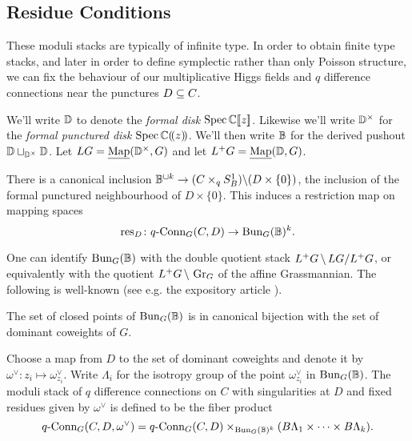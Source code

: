\documentclass[10pt, oneside]{article}
\newcommand{\map}{\ul{\mr{Map}}}
\newcommand{\qconn}{q\text{-Conn}}
\begin{document}
\subsection{Residue Conditions}
These moduli stacks are typically of infinite type.  In order to obtain finite type stacks, and later in order to define symplectic rather than only Poisson structure, we can fix the behaviour of our multiplicative Higgs fields and $q$ difference connections near the punctures $D \subseteq C$.

We'll write $\mathbb{D}$ to denote the \emph{formal disk} $\operatorname{Spec} \mathbb{C}[\![z]\!]$.  Likewise we'll write $\mathbb{D}^\times$ for the \emph{formal punctured disk} $\operatorname{Spec} \mathbb{C}(\!(z)\!)$.  We'll then write $\mathbb{B}$ for the derived pushout $\mathbb{D} \sqcup_{\mathbb{D}^\times} \mathbb{D}$.  Let $LG = \map(\bb D^\times, G)$ and let $L^+G = \map(\bb D, G)$.

There is a canonical inclusion $\mathbb{B}^{\sqcup k} \to (C \times_q S^1_B) \!\!\ \backslash \ \!\! (D \times \{0\})$, the inclusion of the formal punctured neighbourhood of $D \times \{0\}$.  This induces a restriction map on mapping spaces
\[\res_D \colon \qconn_G(C, D) \to \bun_G(\bb B)^k.\]

One can identify $\operatorname{Bun}_G(\mathbb{B})$ with the double quotient stack $L^+G \!\ \backslash \ \! LG / L^+G$, or equivalently with the quotient $L^+G \!\ \backslash \ \! \operatorname{Gr}_G$ of the affine Grassmannian.  The following is well-known (see e.g. the expository article \cite{Zhu}).

\begin{lemma}
The set of closed points of $\operatorname{Bun}_G(\mathbb{B})$ is in canonical bijection with the set of dominant coweights of $G$.
\end{lemma}

\begin{definition}
Choose a map from $D$ to the set of dominant coweights and denote it by $\omega^\vee \colon z_i \mapsto \omega^\vee_{z_i}$.  Write $\Lambda_i$ for the isotropy group of the point $\omega^\vee_{z_i}$ in $\operatorname{Bun}_G(\mathbb{B})$. The moduli stack of $q$ difference connections on $C$ with singularities at $D$ and fixed residues given by $\omega^\vee$ is defined to be the fiber product
\[\qconn_G(C,D, \omega^\vee) = \qconn_G(C,D) \times_{\bun_G(\bb B)^k} (B\Lambda_1 \times \cdots \times B\Lambda_k).\]
\end{definition}
\end{document}
